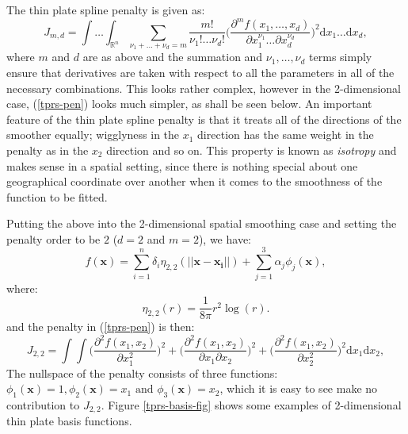 The thin plate spline penalty is given as:
\begin{equation}
J_{m,d} = \int \ldots \int_{\mathbb{R}^n} \sum_{\nu_1 + \dots + \nu_d=m} \frac{m!}{\nu_1! \dots \nu_d!}\Big( \frac{\partial^m f(x_1,\dots,x_d)}{\partial x_1^{\nu_1} \ldots  \partial x_d^{\nu_d}} \Big)^2 \text{d} x_1 \ldots  \text{d} x_d,
\label{tprs-pen}
\end{equation}
where $m$ and $d$ are as above and the summation and $\nu_1,\ldots,\nu_d$ terms simply ensure that derivatives are taken with respect to all the parameters in all of the necessary combinations. This looks rather complex, however in the 2-dimensional case, (\ref{tprs-pen}) looks much simpler, as shall be seen below. An important feature of the thin plate spline penalty is that it treats all of the directions of the smoother equally; wigglyness in the $x_1$ direction has the same weight in the penalty as in the $x_2$ direction and so on. This property is known as \textit{isotropy} and makes sense in a spatial setting, since there is nothing special about one geographical coordinate over another when it comes to the smoothness of the function to be fitted.

Putting the above into the 2-dimensional spatial smoothing case and setting the penalty order to be $2$ ($d=2$ and $m=2$), we have:
\begin{equation*}
f(\mathbf{x}) = \sum_{i=1}^n \delta_i \eta_{2,2}(\lvert \lvert \mathbf{x}-\mathbf{x_i}\rvert \rvert) + \sum_{j=1}^3 \alpha_j \phi_j(\mathbf{x}),
\end{equation*}
where:
\begin{equation*}
\eta_{2,2}(r) = \frac{1}{8\pi} r^2 \log(r).
\end{equation*}
and the penalty in (\ref{tprs-pen}) is then:
\begin{equation*}
J_{2,2} = \int \int \Big( \frac{\partial^2 f(x_1,x_2)}{\partial x_1^2} \Big)^2 + \Big( \frac{\partial^2 f(x_1,x_2)}{\partial x_1  \partial x_2} \Big)^2 + \Big( \frac{\partial^2 f(x_1,x_2)}{\partial x_2^2} \Big)^2 \text{d} x_1 \text{d} x_2,
\end{equation*}
The nullspace of the penalty consists of three functions: $\phi_1(\mathbf{x})=1, \phi_2(\mathbf{x})=x_1 \text{ and } \phi_3(\mathbf{x})=x_2$, which it is easy to see make no contribution to $J_{2,2}$. Figure \ref{tprs-basis-fig} shows some examples of 2-dimensional thin plate basis functions.


